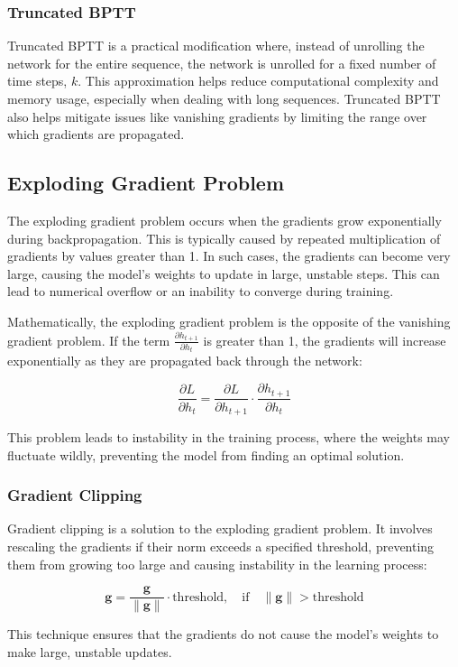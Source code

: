 \documentclass{article}
\begin{document}
\subsubsection{Truncated BPTT}
Truncated BPTT is a practical modification where, instead of unrolling the network for the entire sequence, the network is unrolled for a fixed number of time steps, \(k\). This approximation helps reduce computational complexity and memory usage, especially when dealing with long sequences. Truncated BPTT also helps mitigate issues like vanishing gradients by limiting the range over which gradients are propagated.

\subsection{Exploding Gradient Problem}
The exploding gradient problem occurs when the gradients grow exponentially during backpropagation. This is typically caused by repeated multiplication of gradients by values greater than 1. In such cases, the gradients can become very large, causing the model's weights to update in large, unstable steps. This can lead to numerical overflow or an inability to converge during training.

Mathematically, the exploding gradient problem is the opposite of the vanishing gradient problem. If the term \(\frac{\partial h_{t+1}}{\partial h_t}\) is greater than 1, the gradients will increase exponentially as they are propagated back through the network:

\[
\frac{\partial L}{\partial h_t} = \frac{\partial L}{\partial h_{t+1}} \cdot \frac{\partial h_{t+1}}{\partial h_t}
\]

This problem leads to instability in the training process, where the weights may fluctuate wildly, preventing the model from finding an optimal solution.

\subsubsection{Gradient Clipping}
Gradient clipping is a solution to the exploding gradient problem. It involves rescaling the gradients if their norm exceeds a specified threshold, preventing them from growing too large and causing instability in the learning process:

\[
\mathbf{g} = \frac{\mathbf{g}}{\|\mathbf{g}\|} \cdot \text{threshold}, \quad \text{if} \quad \|\mathbf{g}\| > \text{threshold}
\]

This technique ensures that the gradients do not cause the model's weights to make large, unstable updates.
\end{document}

